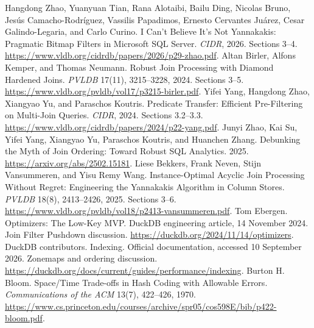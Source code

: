  Hangdong Zhao, Yuanyuan Tian, Rana Alotaibi,
Bailu Ding, Nicolas Bruno, Jes\'us Camacho-Rodr\'iguez, Vassilis Papadimos,
Ernesto Cervantes Ju\'arez, Cesar Galindo-Legaria, and Carlo Curino.
I Can't Believe It's Not Yannakakis: Pragmatic Bitmap Filters in Microsoft
SQL Server. \emph{CIDR}, 2026. Sections 3--4.
\url{https://www.vldb.org/cidrdb/papers/2026/p29-zhao.pdf}.
 Altan Birler, Alfons Kemper, and Thomas Neumann.
Robust Join Processing with Diamond Hardened Joins.
\emph{PVLDB} 17(11), 3215--3228, 2024. Sections 3--5.
\url{https://www.vldb.org/pvldb/vol17/p3215-birler.pdf}.
 Yifei Yang, Hangdong Zhao, Xiangyao Yu, and Paraschos Koutris.
Predicate Transfer: Efficient Pre-Filtering on Multi-Join Queries.
\emph{CIDR}, 2024. Sections 3.2--3.3.
\url{https://www.vldb.org/cidrdb/papers/2024/p22-yang.pdf}.
 Junyi Zhao, Kai Su, Yifei Yang, Xiangyao Yu,
Paraschos Koutris, and Huanchen Zhang.
Debunking the Myth of Join Ordering: Toward Robust SQL Analytics. 2025.
\url{https://arxiv.org/abs/2502.15181}.
 Liese Bekkers, Frank Neven, Stijn Vansummeren,
and Yisu Remy Wang.
Instance-Optimal Acyclic Join Processing Without Regret: Engineering the
Yannakakis Algorithm in Column Stores.
\emph{PVLDB} 18(8), 2413--2426, 2025. Sections 3--6.
\url{https://www.vldb.org/pvldb/vol18/p2413-vansummeren.pdf}.
 Tom Ebergen. Optimizers: The Low-Key MVP.
DuckDB engineering article, 14 November 2024.
Join Filter Pushdown discussion.
\url{https://duckdb.org/2024/11/14/optimizers}.
 DuckDB contributors. Indexing.
Official documentation, accessed 10 September 2026.
Zonemaps and ordering discussion.
\url{https://duckdb.org/docs/current/guides/performance/indexing}.
 Burton H. Bloom.
Space/Time Trade-offs in Hash Coding with Allowable Errors.
\emph{Communications of the ACM} 13(7), 422--426, 1970.
\url{https://www.cs.princeton.edu/courses/archive/spr05/cos598E/bib/p422-bloom.pdf}.
